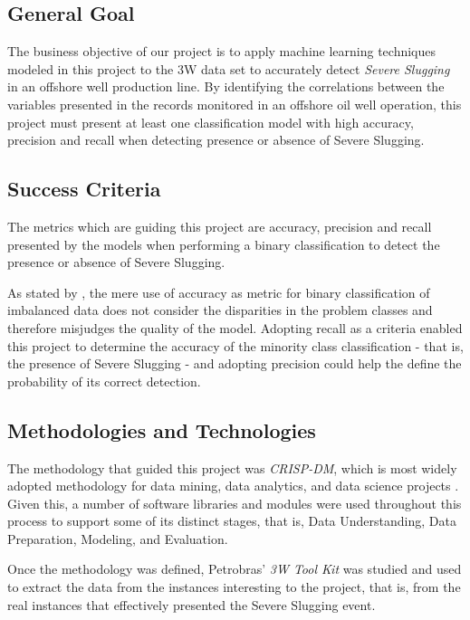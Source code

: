 \documentclass{article}
\begin{document}
\subsection{General Goal}
The business objective of our project is to apply machine learning techniques modeled in this project to the 3W data set to accurately detect \emph{Severe Slugging} in an offshore well production line. By identifying the correlations between the variables presented in the records monitored in an offshore oil well operation, this project must present at least one classification model with high accuracy, precision and recall when detecting presence or absence of Severe Slugging. 

\subsection{Success Criteria}
The metrics which are guiding this project are accuracy, precision and recall presented by the models when performing a binary classification to detect the presence or absence of Severe Slugging. 

As stated by \textcite{wegier_ksieniewicz_2020}, the mere use of accuracy as metric for binary classification of imbalanced data does not consider the disparities in the problem classes and therefore misjudges the quality of the model. Adopting recall as a criteria enabled this project to determine the accuracy of the minority class classification - that is, the presence of Severe Slugging - and adopting precision could help the define the  probability of its correct detection.

\subsection{Methodologies and Technologies}

The methodology that guided this project was \emph{CRISP-DM}, which is most widely adopted methodology for data mining, data analytics, and data science projects \parencite{ibm_crisp_dm}. Given this, a number of software libraries and modules were used throughout this process to support some of its distinct stages, that is, Data Understanding, Data Preparation, Modeling, and Evaluation. 

Once the methodology was defined, Petrobras' \emph{3W Tool Kit} was studied and used to extract the data from the instances interesting to the project, that is, from the real instances that effectively presented the Severe Slugging event.
\end{document}
